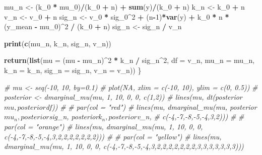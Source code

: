 \documentclass[]{book}
\newenvironment{Shaded}{\begin{snugshade}}{\end{snugshade}}
\newcommand{\KeywordTok}[1]{\textcolor[rgb]{0.13,0.29,0.53}{\textbf{#1}}}
\newcommand{\DataTypeTok}[1]{\textcolor[rgb]{0.13,0.29,0.53}{#1}}
\newcommand{\DecValTok}[1]{\textcolor[rgb]{0.00,0.00,0.81}{#1}}
\newcommand{\StringTok}[1]{\textcolor[rgb]{0.31,0.60,0.02}{#1}}
\newcommand{\CommentTok}[1]{\textcolor[rgb]{0.56,0.35,0.01}{\textit{#1}}}
\newcommand{\OperatorTok}[1]{\textcolor[rgb]{0.81,0.36,0.00}{\textbf{#1}}}
\newcommand{\NormalTok}[1]{#1}
\begin{document}
\begin{Shaded}
\begin{Highlighting}[]
\NormalTok{  mu_n <-}\StringTok{ }\NormalTok{(k_}\DecValTok{0} \OperatorTok{*}\StringTok{ }\NormalTok{mu_}\DecValTok{0}\NormalTok{)}\OperatorTok{/}\NormalTok{(k_}\DecValTok{0} \OperatorTok{+}\StringTok{ }\NormalTok{n) }\OperatorTok{+}\StringTok{ }\KeywordTok{sum}\NormalTok{(y)}\OperatorTok{/}\NormalTok{(k_}\DecValTok{0} \OperatorTok{+}\StringTok{ }\NormalTok{n)}
\NormalTok{  k_n <-}\StringTok{ }\NormalTok{k_}\DecValTok{0} \OperatorTok{+}\StringTok{ }\NormalTok{n}
\NormalTok{  v_n <-}\StringTok{ }\NormalTok{v_}\DecValTok{0} \OperatorTok{+}\StringTok{ }\NormalTok{n}
\NormalTok{  sig_n <-}\StringTok{ }\NormalTok{v_}\DecValTok{0} \OperatorTok{*}\StringTok{ }\NormalTok{sig_}\DecValTok{0}\OperatorTok{^}\DecValTok{2} \OperatorTok{+}\StringTok{ }\NormalTok{(n}\OperatorTok{-}\DecValTok{1}\NormalTok{)}\OperatorTok{*}\KeywordTok{var}\NormalTok{(y) }\OperatorTok{+}\StringTok{ }\NormalTok{k_}\DecValTok{0} \OperatorTok{*}\StringTok{ }\NormalTok{n }\OperatorTok{*}\StringTok{ }\NormalTok{(y_mean }\OperatorTok{-}\StringTok{ }\NormalTok{mu_}\DecValTok{0}\NormalTok{)}\OperatorTok{^}\DecValTok{2} \OperatorTok{/}\StringTok{ }\NormalTok{(k_}\DecValTok{0} \OperatorTok{+}\StringTok{ }\NormalTok{n)}
\NormalTok{  sig_n <-}\StringTok{ }\NormalTok{sig_n }\OperatorTok{/}\StringTok{ }\NormalTok{v_n}
  
  \KeywordTok{print}\NormalTok{(}\KeywordTok{c}\NormalTok{(mu_n, k_n, sig_n, v_n))}
  
  \KeywordTok{return}\NormalTok{(}\KeywordTok{list}\NormalTok{(}\DataTypeTok{mu =}\NormalTok{ (mu }\OperatorTok{-}\StringTok{ }\NormalTok{mu_n)}\OperatorTok{^}\DecValTok{2} \OperatorTok{*}\StringTok{ }\NormalTok{k_n }\OperatorTok{/}\StringTok{ }\NormalTok{sig_n}\OperatorTok{^}\DecValTok{2}\NormalTok{, }\DataTypeTok{df =}\NormalTok{ v_n,}
           \DataTypeTok{mu_n =}\NormalTok{ mu_n, }\DataTypeTok{k_n =}\NormalTok{ k_n, }\DataTypeTok{sig_n =}\NormalTok{ sig_n, }\DataTypeTok{v_n =}\NormalTok{ v_n))}
\NormalTok{\}}
\end{Highlighting}
\end{Shaded}

\begin{Shaded}
\begin{Highlighting}[]
\CommentTok{# mu <- seq(-10, 10, by=0.1)}
\CommentTok{# plot(NA, xlim = c(-10, 10), ylim = c(0, 0.5))}
\CommentTok{# posterior <- dmarginal_mu(mu, 1, 10, 0, 0, c(1,2))}
\CommentTok{# lines(mu, dt(posterior$mu, posterior$df))}
\CommentTok{# }
\CommentTok{# par(col = "red")}
\CommentTok{# lines(mu, dmarginal_mu(mu, posterior$mu_n, posterior$sig_n, posterior$k_n, posterior$v_n, }
\CommentTok{#                        c(-4,-7,-8,-5,-4,3,2)))}
\CommentTok{# }
\CommentTok{# par(col = "orange")}
\CommentTok{# lines(mu, dmarginal_mu(mu, 1, 10, 0, 0, c(-4,-7,-8,-5,-4,3,2,2,2,2,2,2,2)))}
\CommentTok{# }
\CommentTok{# par(col = "yellow")}
\CommentTok{# lines(mu, dmarginal_mu(mu, 1, 10, 0, 0, c(-4,-7,-8,-5,-4,3,2,2,2,2,2,2,2,3,3,3,3,3,3,3)))}
\end{Highlighting}
\end{Shaded}


\end{document}
